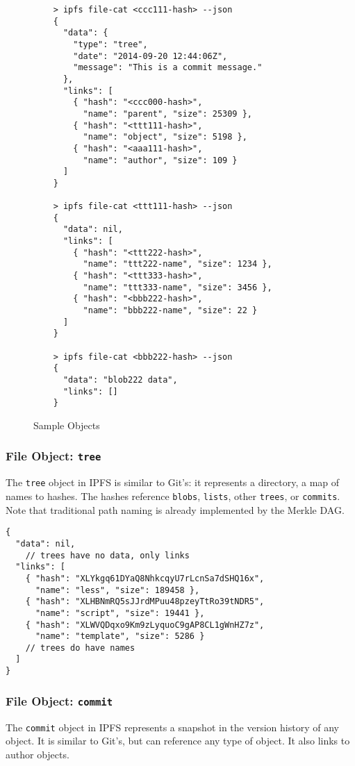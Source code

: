 \documentclass{sig-alternate}
\begin{document}
\begin{figure}
\begin{verbatim}
    > ipfs file-cat <ccc111-hash> --json
    {
      "data": {
        "type": "tree",
        "date": "2014-09-20 12:44:06Z",
        "message": "This is a commit message."
      },
      "links": [
        { "hash": "<ccc000-hash>",
          "name": "parent", "size": 25309 },
        { "hash": "<ttt111-hash>",
          "name": "object", "size": 5198 },
        { "hash": "<aaa111-hash>",
          "name": "author", "size": 109 }
      ]
    }

    > ipfs file-cat <ttt111-hash> --json
    {
      "data": nil,
      "links": [
        { "hash": "<ttt222-hash>",
          "name": "ttt222-name", "size": 1234 },
        { "hash": "<ttt333-hash>",
          "name": "ttt333-name", "size": 3456 },
        { "hash": "<bbb222-hash>",
          "name": "bbb222-name", "size": 22 }
      ]
    }

    > ipfs file-cat <bbb222-hash> --json
    {
      "data": "blob222 data",
      "links": []
    }
\end{verbatim}
\caption{Sample Objects} \label{fig:sample-objects}
\end{figure}


\subsubsection{File Object: \texttt{tree}}

The \texttt{tree} object in IPFS is similar to Git's: it represents a
directory, a map of names to hashes. The hashes reference \texttt{blobs}, \texttt{lists}, other \texttt{trees}, or \texttt{commits}. Note that traditional path naming is already implemented by the Merkle DAG.

\begin{verbatim}
{
  "data": nil,
    // trees have no data, only links
  "links": [
    { "hash": "XLYkgq61DYaQ8NhkcqyU7rLcnSa7dSHQ16x",
      "name": "less", "size": 189458 },
    { "hash": "XLHBNmRQ5sJJrdMPuu48pzeyTtRo39tNDR5",
      "name": "script", "size": 19441 },
    { "hash": "XLWVQDqxo9Km9zLyquoC9gAP8CL1gWnHZ7z",
      "name": "template", "size": 5286 }
    // trees do have names
  ]
}
\end{verbatim}


\subsubsection{File Object: \texttt{commit}}

The \texttt{commit} object in IPFS represents a snapshot in the version history of any object. It is similar to Git's, but can reference any type of object. It also links to author objects.
\end{document}

